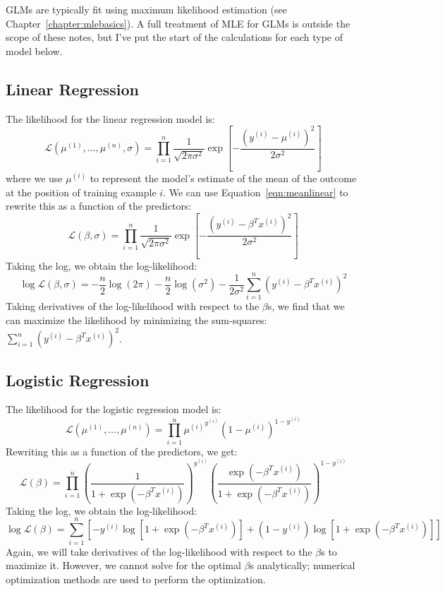 GLMs are typically fit using maximum likelihood estimation (see Chapter~\ref{chapter:mlebasics}). A full treatment of MLE for GLMs is outside the scope of these notes, but I've put the start of the calculations for each type of model below.    

\subsection{Linear Regression} 

The likelihood for the linear regression model is:
$$ \mathcal{L}(\mu^{(1)}, \dots, \mu^{(n)}, \sigma) = \prod_{i=1}^n \frac{1}{\sqrt{2 \pi \sigma^2}} \exp \left[ - \frac{(y^{(i)} - \mu^{(i)})^2}{2 \sigma^2} \right] $$
where we use $\mu^{(i)}$ to represent the model's estimate of the mean of the outcome at the position of training example $i$. We can use Equation~\ref{eqn:meanlinear} to rewrite this as a function of the predictors:
$$ \mathcal{L}(\beta, \sigma) = \prod_{i=1}^n \frac{1}{\sqrt{2 \pi \sigma^2}} \exp \left[ - \frac{(y^{(i)} - \beta^T x^{(i)})^2}{2 \sigma^2} \right] $$
Taking the log, we obtain the log-likelihood:
$$ \log \mathcal{L}(\beta, \sigma) = -\frac{n}{2} \log (2 \pi) - \frac{n}{2} \log(\sigma^2) - \frac{1}{2 \sigma^2} \sum_{i=1}^n \left( y^{(i)} - \beta^T x^{(i)} \right)^2 $$
Taking derivatives of the log-likelihood with respect to the $\beta$s, we find that we can maximize the likelihood by minimizing the sum-squares: $\sum_{i=1}^n \left( y^{(i)} - \beta^T x^{(i)} \right)^2$.

\subsection{Logistic Regression}

The likelihood for the logistic regression model is:
$$ \mathcal{L}(\mu^{(1)}, \dots, \mu^{(n)}) = \prod_{i=1}^n {\mu^{(i)}}^{y^{(i)}} (1-\mu^{(i)})^{1 - y^{(i)}} $$
Rewriting this as a function of the predictors, we get:
$$ \mathcal{L}(\beta) = \prod_{i=1}^n \left( \frac{1}{1 + \exp(-\beta^T x^{(i)})} \right)^{y^{(i)}} \left( \frac{\exp(-\beta^T x^{(i)})}{1 + \exp(-\beta^T x^{(i)})} \right)^{1 - y^{(i)}} $$
Taking the log, we obtain the log-likelihood:
$$ \log \mathcal{L}(\beta) = \sum_{i=1}^n \left[ -y^{(i)} \log \left[ 1 + \exp(-\beta^T x^{(i)}) \right] + (1 -y^{(i)}) \log \left[ 1 + \exp(-\beta^T x^{(i)}) \right] \right] $$
Again, we will take derivatives of the log-likelihood with respect to the $\beta$s to maximize it. However, we cannot solve for the optimal $\beta$s analytically; numerical optimization methods are used to perform the optimization.

